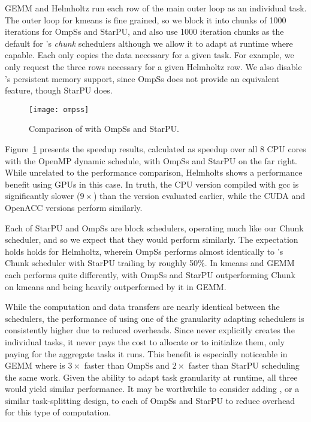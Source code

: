 GEMM and Helmholtz run each row of the main outer loop as an individual task.
The outer loop for kmeans is fine grained, so we block it into chunks of 1000
iterations for OmpSs and StarPU, and also use 1000 iteration chunks as the
default for \tsar's \emph{chunk} schedulers although we allow it to adapt at
runtime where capable. Each only copies the data necessary for a given task.
For example, we only request the three rows necessary for a given Helmholtz row.
We also disable \tsar's persistent memory support, since OmpSs does not provide an
equivalent feature, though StarPU does.

\begin{figure}[t]
    \begin{center}
        \texttt{[image: ompss]}
    \end{center}
    \caption{Comparison of \tsar with OmpSs and StarPU.}
    \label{fig:ompssres}
\end{figure}

Figure~\ref{fig:ompssres} presents the speedup results, calculated as speedup
over all 8 CPU cores with the OpenMP dynamic schedule, with OmpSs and StarPU
on the far right. While unrelated to the performance comparison, Helmholts
shows a performance benefit using GPUs in this case. In truth, the CPU version
compiled with gcc is significantly slower ($9\times$) than the version
evaluated earlier, while the CUDA and OpenACC versions perform similarly. 

Each of StarPU and OmpSs are block schedulers, operating much like our Chunk
scheduler, and so we expect that they would perform similarly. The expectation
holds holds for Helmholtz, wherein OmpSs performs almost identically to \tsar's
Chunk scheduler with StarPU trailing by roughly 50\%.  In kmeans and GEMM
each performs quite differently, with  OmpSs and StarPU outperforming Chunk on
kmeans and being heavily outperformed by it in GEMM.

While the computation and data transfers are nearly identical between the
schedulers, the performance of \tsar using one of the granularity adapting
schedulers is consistently higher due to reduced overheads.  Since \tsar never
explicitly creates the individual tasks, it never pays the cost to allocate or
to initialize them, only paying for the aggregate tasks it runs.  This benefit
is especially noticeable in GEMM where \tsar is $3\times$ faster than OmpSs
and $2\times$ faster than StarPU scheduling the same work.  Given the ability
to adapt task granularity at runtime, all three would yield similar
performance. It may be worthwhile to consider adding \tsar, or a similar
task-splitting design, to each of OmpSs and StarPU to reduce overhead for this
type of computation.

